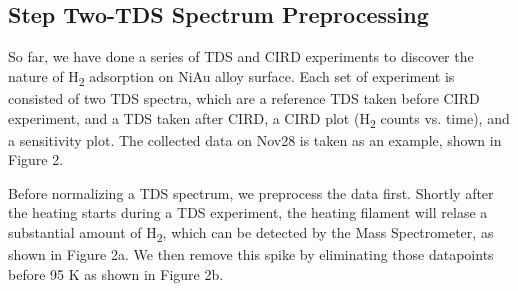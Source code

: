 \documentclass{article}
\begin{document}
\subsection{Step Two-TDS Spectrum Preprocessing}
So far, we have done a series of TDS and CIRD experiments to discover the
nature of H\textsubscript{2} adsorption on NiAu alloy surface. Each set of
experiment is consisted of two TDS spectra, which are a reference TDS taken
before CIRD experiment, and a TDS taken after CIRD, a CIRD plot
(H\textsubscript{2} counts vs. time), and a sensitivity plot. The collected
data on Nov28 is taken as an example, shown in Figure 2.

Before normalizing a TDS spectrum, we preprocess the data first. Shortly after
the heating starts during a TDS experiment, the heating filament will relase a
substantial amount of H\textsubscript{2}, which can be detected by the Mass
Spectrometer, as shown in Figure 2a. We then remove this spike by eliminating
those datapoints before 95 K as shown in Figure 2b.
\end{document}

